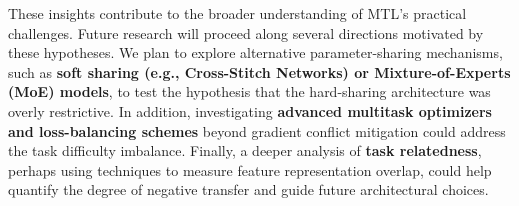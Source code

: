 These insights contribute to the broader understanding of MTL's practical challenges. Future research will proceed along several directions motivated by these hypotheses. We plan to explore alternative parameter-sharing mechanisms, such as \textbf{soft sharing (e.g., Cross-Stitch Networks) or Mixture-of-Experts (MoE) models}, to test the hypothesis that the hard-sharing architecture was overly restrictive. In addition, investigating \textbf{advanced multitask optimizers and loss-balancing schemes} beyond gradient conflict mitigation could address the task difficulty imbalance. Finally, a deeper analysis of \textbf{task relatedness}, perhaps using techniques to measure feature representation overlap, could help quantify the degree of negative transfer and guide future architectural choices.
